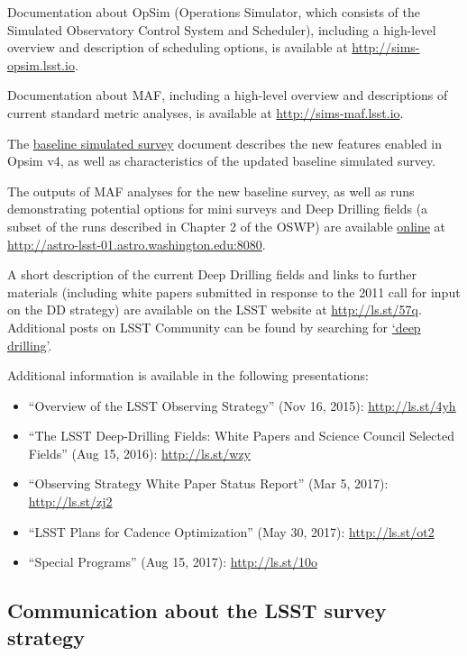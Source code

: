 \documentclass[DM,lsstdraft,toc,usenatbib]{lsstdoc}
\begin{document}
Documentation about OpSim (Operations Simulator, which consists of the Simulated Observatory Control System and 
Scheduler), including a high-level overview and description of scheduling options, is available at \url{http://sims-opsim.lsst.io}.

Documentation about MAF, including a high-level overview and descriptions of current standard metric analyses, is available at \url{http://sims-maf.lsst.io}. 

The \href{https://github.com/lsst-pst/survey_strategy/blob/master/db/baseline-doc/baseline.pdf}{baseline simulated survey} document describes the new features enabled in Opsim v4, as well as characteristics of the updated baseline simulated survey. 

The outputs of MAF analyses for the new baseline survey, as well as runs demonstrating potential options for mini surveys and Deep 
Drilling fields (a subset of the runs described in Chapter 2 of the OSWP) are available \href{http://astro-lsst-01.astro.washington.edu:8080}{online} at \url{http://astro-lsst-01.astro.washington.edu:8080}. 

A short description of the current Deep Drilling fields and links to further materials (including white papers submitted in response to the 2011 call for input on the DD strategy) are available on the LSST website at \href{https://www.lsst.org/scientists/survey-design/ddf}{http://ls.st/57q}. Additional posts on LSST Community can be found by searching for \href{https://community.lsst.org/search?q=deep%20drilling}{`deep drilling'}. 

Additional information is available in the following presentations:
\begin{itemize}
\item ``Overview of the LSST Observing Strategy'' (Nov 16, 2015): \url{http://ls.st/4yh}
\item ``The LSST Deep-Drilling Fields: White Papers and Science Council Selected Fields'' (Aug 15, 2016): \url{http://ls.st/wzy}
\item ``Observing Strategy White Paper Status Report'' (Mar 5, 2017): \url{http://ls.st/zj2}
\item ``LSST Plans for Cadence Optimization'' (May 30, 2017): \url{http://ls.st/ot2}
\item ``Special Programs'' (Aug 15, 2017): \url{http://ls.st/10o}
\end{itemize}


\subsection{Communication about the LSST survey strategy} 
\end{document}

